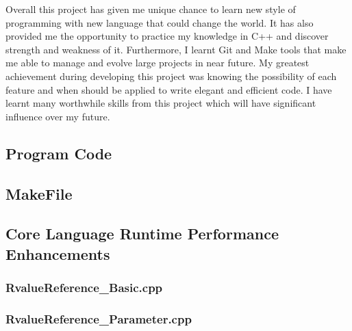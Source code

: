 \documentclass[11pt]{report}
\newcommand{\Cpp}{\lstset{language=C++,keywordstyle=\bfseries,breaklines,breakindent=30pt}}
\newcommand{\Make}{\lstset{language=make}}
\begin{document}
Overall this project has given me unique chance to learn new style of programming with new language that could change the world. It has also provided me the opportunity to practice my knowledge in C++ and discover strength and weakness of it. Furthermore, I learnt Git and Make tools that make me able to manage and evolve large projects in near future. My greatest achievement during developing this project was knowing the possibility of each feature and when should be applied to write elegant and efficient code. I have learnt many worthwhile skills from this project which will have significant influence over my future.


	


\begin{appendix}

\chapter{Program Code}
\label{chapter:Programcode}


\section{MakeFile}
\label{Makefile}

\Make

%
\newpage


\section{Core Language Runtime Performance Enhancements}
\label{Appendix: corelanguage runtime performance}

\Cpp

\subsection{RvalueReference\_Basic.cpp}
\label{RvalueReference_Basic}


\subsection{RvalueReference\_Parameter.cpp}
\label{RvalueReference_Parameter}



\end{appendix}
\end{document}
